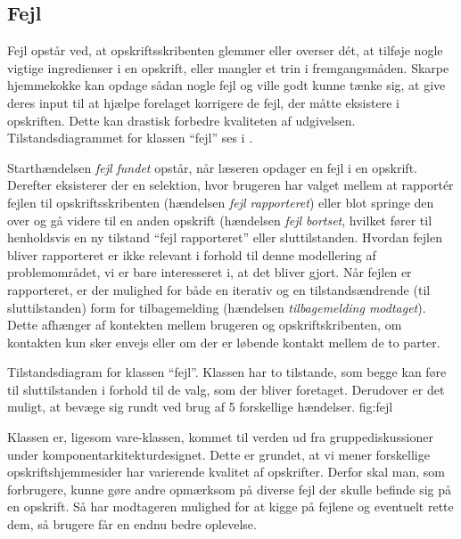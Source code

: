 \subsection{Fejl}
Fejl opstår ved, at opskriftsskribenten glemmer eller overser d\'{e}t, at tilføje nogle vigtige ingredienser i en opskrift, eller \fx mangler et trin i fremgangsmåden. Skarpe hjemmekokke kan opdage sådan nogle fejl og ville godt kunne tænke sig, at give deres input til at hjælpe forelaget korrigere de fejl, der måtte eksistere i opskriften. Dette kan drastisk forbedre kvaliteten af udgivelsen. Tilstandsdiagrammet for klassen ``fejl'' ses i .

Starthændelsen \textit{fejl fundet} opstår, når læseren opdager en fejl i en opskrift. Derefter eksisterer der en selektion, hvor brugeren har valget mellem at rapport\'{e}r fejlen til opskriftsskribenten (hændelsen \textit{fejl rapporteret}) eller blot springe den over og gå videre til en anden opskrift (hændelsen \textit{fejl bortset}, hvilket fører til henholdsvis en ny tilstand ``fejl rapporteret'' eller sluttilstanden. Hvordan fejlen bliver rapporteret er ikke relevant i forhold til denne modellering af problemområdet, vi er bare interesseret i, at det bliver gjort. Når fejlen er rapporteret, er der mulighed for både en iterativ og en tilstandsændrende (til sluttilstanden) form for tilbagemelding (hændelsen \textit{tilbagemelding modtaget}). Dette afhænger af kontekten mellem brugeren og opskriftskribenten, om kontakten kun sker envejs eller om der er løbende kontakt mellem de to parter.

{Tilstandsdiagram for klassen ``fejl''. Klassen har to tilstande, som begge kan føre til sluttilstanden i forhold til de valg, som der bliver foretaget. Derudover er det muligt, at bevæge sig rundt ved brug af 5 forskellige hændelser.}
  {fig:fejl}

Klassen er, ligesom vare-klassen, kommet til verden ud fra gruppediskussioner under komponentarkitekturdesignet. Dette er grundet, at vi mener forskellige opskriftshjemmesider har varierende kvalitet af opskrifter. Derfor skal man, som forbrugere, kunne gøre andre opmærksom på diverse fejl der skulle befinde sig på en opskrift. Så har modtageren mulighed for at kigge på fejlene og eventuelt rette dem, så brugere får en endnu bedre oplevelse.
